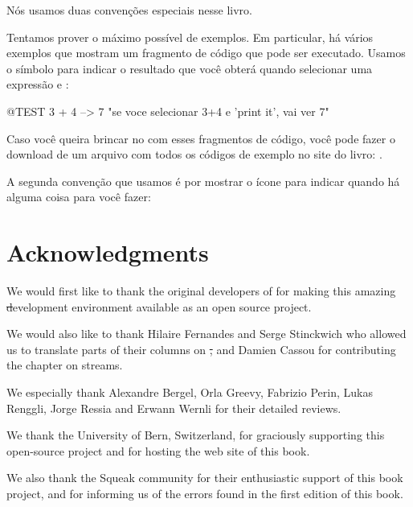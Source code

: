 \documentclass[a4paper,10pt,twoside]{book}
\begin{document}
Nós usamos duas convenções especiais nesse livro.

Tentamos prover o máximo possível de exemplos.
Em particular, há vários exemplos que mostram um fragmento de código que pode ser executado.  Usamos o símbolo \ct{-->} para indicar o resultado que você obterá quando selecionar uma expressão e :

\begin{code}{@TEST}
3 + 4 --> 7    "se voce selecionar 3+4 e 'print it', vai ver 7"
\end{code}

Caso você queira brincar no \pharo com esses fragmentos de código, você pode fazer o download de um arquivo com todos os códigos de exemplo no site do livro: \pbe.

A segunda convenção que usamos é por mostrar o ícone \dothisicon{} para indicar quando há alguma coisa para você fazer:


\section*{Acknowledgments}

We would first like to thank the original developers of \squeak for making this amazing \st development environment available as an open source project.

We would also like to thank Hilaire Fernandes and Serge Stinckwich who allowed us to translate parts of their columns on \st, and Damien Cassou for contributing the chapter on streams.

We especially thank Alexandre Bergel, Orla Greevy, Fabrizio Perin, Lukas Renggli, Jorge Ressia and Erwann Wernli for their detailed reviews.

We thank the University of Bern, Switzerland, for graciously supporting this open-source project and for hosting the web site of this book.

We also thank the Squeak community for their enthusiastic support of this book project, and for informing us of the errors found in the first edition of this book.

\ifx\wholebook\relax\else
   
   
\end{document}
